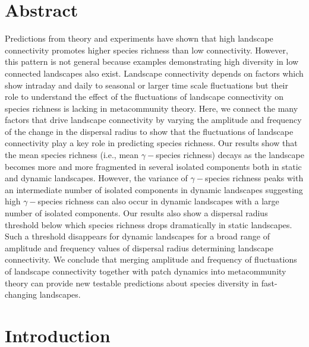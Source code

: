 \documentclass[12pt]{article}
\begin{document}
\section*{Abstract}
Predictions from theory and experiments have shown that high landscape connectivity promotes higher species richness than low connectivity. However, this pattern is not general because examples demonstrating high diversity in low connected landscapes also exist. Landscape connectivity depends on factors which show intraday and daily to seasonal or larger time scale fluctuations but their role to understand the effect of the fluctuations of landscape connectivity on species richness is lacking in metacommunity theory. Here, we connect the many factors that drive landscape connectivity by varying the amplitude and frequency of the change in the dispersal radius to show that the fluctuations of landscape connectivity play a key role in predicting species richness. Our results show that the mean species richness (i.e., mean $\gamma-$species richness) decays as the landscape becomes more and more fragmented in several isolated components both in static and dynamic landscapes. However, the variance of $\gamma-$species richness peaks with an intermediate number of isolated components in dynamic landscapes suggesting high $\gamma-$species richness can also occur in dynamic landscapes with a large number of isolated components. Our results also show a dispersal radius threshold below which species richness drops dramatically in static landscapes. Such a threshold disappears for dynamic landscapes for a broad range of amplitude and frequency values of dispersal radius determining landscape connectivity. We conclude that merging amplitude and frequency of fluctuations of landscape connectivity together with patch dynamics into metacommunity theory can provide new testable predictions about species diversity in fast-changing landscapes.

\newpage
\section*{Introduction}
\end{document}
